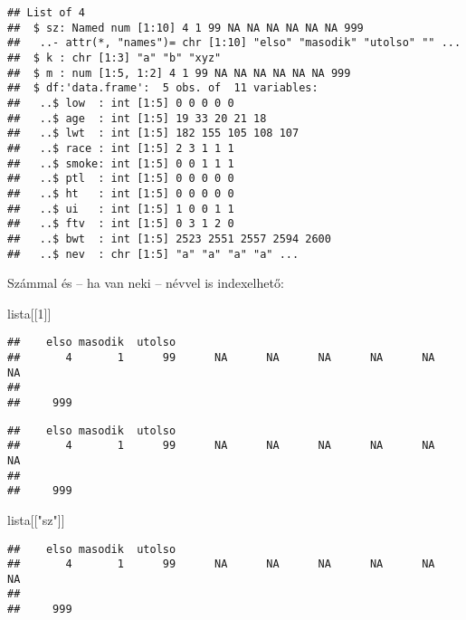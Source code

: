 \documentclass[]{book}
\newenvironment{Shaded}{\begin{snugshade}}{\end{snugshade}}
\newcommand{\DecValTok}[1]{\textcolor[rgb]{0.00,0.00,0.81}{#1}}
\newcommand{\StringTok}[1]{\textcolor[rgb]{0.31,0.60,0.02}{#1}}
\newcommand{\OperatorTok}[1]{\textcolor[rgb]{0.81,0.36,0.00}{\textbf{#1}}}
\newcommand{\NormalTok}[1]{#1}
\begin{document}
\begin{verbatim}
## List of 4
##  $ sz: Named num [1:10] 4 1 99 NA NA NA NA NA NA 999
##   ..- attr(*, "names")= chr [1:10] "elso" "masodik" "utolso" "" ...
##  $ k : chr [1:3] "a" "b" "xyz"
##  $ m : num [1:5, 1:2] 4 1 99 NA NA NA NA NA NA 999
##  $ df:'data.frame':  5 obs. of  11 variables:
##   ..$ low  : int [1:5] 0 0 0 0 0
##   ..$ age  : int [1:5] 19 33 20 21 18
##   ..$ lwt  : int [1:5] 182 155 105 108 107
##   ..$ race : int [1:5] 2 3 1 1 1
##   ..$ smoke: int [1:5] 0 0 1 1 1
##   ..$ ptl  : int [1:5] 0 0 0 0 0
##   ..$ ht   : int [1:5] 0 0 0 0 0
##   ..$ ui   : int [1:5] 1 0 0 1 1
##   ..$ ftv  : int [1:5] 0 3 1 2 0
##   ..$ bwt  : int [1:5] 2523 2551 2557 2594 2600
##   ..$ nev  : chr [1:5] "a" "a" "a" "a" ...
\end{verbatim}

Számmal és -- ha van neki -- névvel is indexelhető:

\begin{Shaded}
\begin{Highlighting}[]
\NormalTok{lista[[}\DecValTok{1}\NormalTok{]]}
\end{Highlighting}
\end{Shaded}

\begin{verbatim}
##    elso masodik  utolso                                                 
##       4       1      99      NA      NA      NA      NA      NA      NA 
##         
##     999
\end{verbatim}

\begin{Shaded}
\end{Shaded}

\begin{verbatim}
##    elso masodik  utolso                                                 
##       4       1      99      NA      NA      NA      NA      NA      NA 
##         
##     999
\end{verbatim}

\begin{Shaded}
\begin{Highlighting}[]
\NormalTok{lista[[}\StringTok{"sz"}\NormalTok{]]}
\end{Highlighting}
\end{Shaded}

\begin{verbatim}
##    elso masodik  utolso                                                 
##       4       1      99      NA      NA      NA      NA      NA      NA 
##         
##     999
\end{verbatim}
\end{document}
